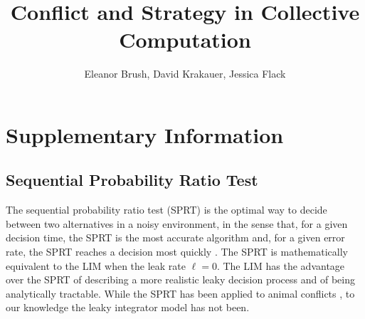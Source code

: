 \documentclass{article}
\title{Conflict and Strategy in Collective Computation}
\author{Eleanor Brush, David Krakauer, Jessica Flack}
\begin{document}
\maketitle
\tableofcontents

\section*{Supplementary Information}
\renewcommand{\thesubsection}{\Alph{subsection}.}
\renewcommand{\thesubsubsection}{\thesubsection \arabic{subsubsection}}
\renewcommand{\thetheorem}{\arabic{theorem}}

\subsection{Sequential Probability Ratio Test }
The sequential probability ratio test (SPRT) is the optimal way to decide between two alternatives in a noisy environment, in the sense that, for a given decision time, the SPRT is the most accurate algorithm and, for a given error rate, the SPRT reaches a decision most quickly \cite{Bogacz:2006uq,Froment:2010fk}.  The SPRT is mathematically equivalent to the LIM when the leak rate $\ell=0$. The LIM has the advantage over the SPRT of describing a more realistic leaky decision process and of being analytically tractable.  While the SPRT has been applied to animal conflicts  \cite{Froment:2010fk}, to our knowledge the leaky integrator model has not been.
\end{document}
